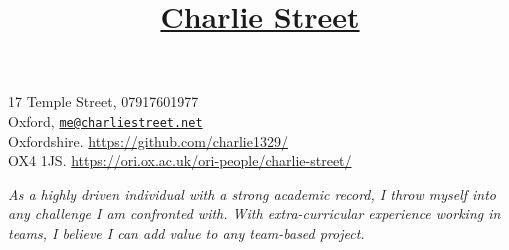 \documentclass[11pt]{article}
\title{\vspace{-80pt}\underline{Charlie Street}}
\date{}
\begin{document}
	\maketitle
	\vspace*{-60pt}
	\begin{flushleft}
	\noindent
	\large 17 Temple Street,
	\hfill
	\large 07917601977 \\
	\large Oxford,
	\hfill 
	\large \href{mailto:me@charliestreet.net}{\nolinkurl{me@charliestreet.net}} \\
	\large Oxfordshire. 
	\hfill
	\large
	\url{https://github.com/charlie1329/}\\
	\large OX4 1JS.
	\hfill
	\large
	\url{https://ori.ox.ac.uk/ori-people/charlie-street/} \\
	\end{flushleft}

	\vspace{-10pt}
	\begin{center}
			\textit{\large As a highly driven individual with a strong academic record, I throw myself into any challenge I am confronted with. With extra-curricular experience working in teams, I believe I can add value to any team-based project.}
	\end{center}
			
\end{document}
